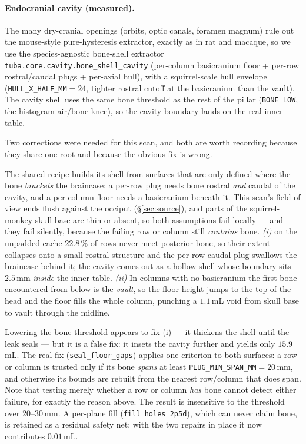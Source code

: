 \documentclass{compactarticle}
\begin{document}
\paragraph{Endocranial cavity (measured).}
The many dry-cranial openings (orbits, optic canals, foramen magnum)
rule out the mouse-style pure-hysteresis extractor, exactly as in rat
and macaque, so we use the species-agnostic bone-shell extractor
\texttt{tuba.core.cavity.\allowbreak bone\_shell\_cavity} (per-column
basicranium floor + per-row rostral/caudal plugs + per-axial hull), with
a squirrel-scale hull envelope (\texttt{HULL\_X\_HALF\_MM}$=24$, tighter
rostral cutoff at the basicranium than the vault). The cavity shell uses
the same bone threshold as the rest of the pillar
(\texttt{BONE\_LOW}, the histogram air/bone knee), so the cavity
boundary lands on the real inner table.

Two corrections were needed for this scan, and both are worth recording
because they share one root and because the obvious fix is wrong.

The shared recipe builds its shell from surfaces that are only defined
where the bone \emph{brackets} the braincase: a per-row plug needs bone
rostral \emph{and} caudal of the cavity, and a per-column floor needs a
basicranium beneath it. This scan's field of view ends flush against
the occiput (\S\ref{sec:source}), and parts of the squirrel-monkey skull base are
thin or absent, so both assumptions fail locally --- and they fail
silently, because the failing row or column still \emph{contains} bone.
\emph{(i)} on the unpadded cache $22.8\,\%$ of rows never meet
posterior bone, so their extent
collapses onto a small rostral structure and the per-row caudal plug
swallows the braincase behind it; the cavity comes out as a hollow shell
whose boundary sits $2.5$\,mm \emph{inside} the inner table.
\emph{(ii)} In columns with no basicranium the first bone encountered
from below is the \emph{vault}, so the floor height jumps to the top of
the head and the floor fills the whole column, punching a
$1.1$\,mL void from skull base to vault through the midline.

Lowering the bone threshold appears to fix (i) --- it thickens the shell
until the leak seals --- but it is a false fix: it insets the cavity
further and yields only $15.9$\,mL. The real fix
(\texttt{seal\_floor\_gaps}) applies one criterion to both surfaces:
a row or column is trusted only if its bone \emph{spans} at least
\texttt{PLUG\_MIN\_SPAN\_MM}$=20$\,mm, and otherwise its bounds are
rebuilt from the nearest row/column that does span. Note that testing
merely whether a row or column \emph{has} bone cannot detect either
failure, for exactly the reason above. The result is insensitive to the
threshold over 20--30\,mm. A per-plane fill
(\texttt{fill\_holes\_2p5d}), which can never claim bone, is retained as
a residual safety net; with the two repairs in place it now contributes
$0.01$\,mL.
\end{document}

